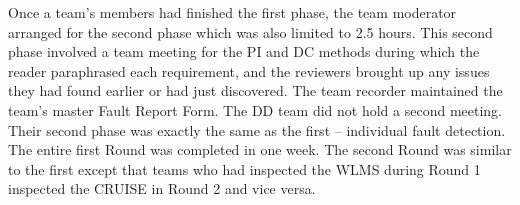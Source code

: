 Once a team's members had finished the first phase, the team 
moderator arranged for the second phase which was also
limited to 2.5 hours. This second phase
involved a team meeting for the PI and DC methods
during which the reader paraphrased each requirement,
and the reviewers brought
up any issues they had found earlier or had just discovered. 
The team  recorder  maintained the team's master Fault Report Form. 
The DD team did not hold a second meeting. Their second phase was 
exactly the same as the first -- individual fault detection.  
The entire first Round was completed in one week. 
The second Round was similar to the first except that teams who
had inspected the WLMS during Round 1 inspected the CRUISE
in Round 2 and vice versa. 




